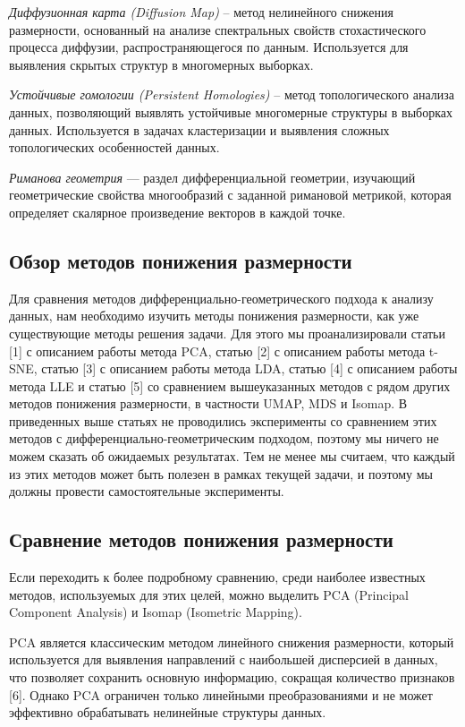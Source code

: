 \documentclass[a4paper,12pt]{extarticle}
\begin{document}
\textit{Диффузионная карта (Diffusion Map)} – метод нелинейного снижения размерности, основанный на анализе спектральных свойств стохастического процесса диффузии, распространяющегося по данным. Используется для выявления скрытых структур в многомерных выборках.

\textit{Устойчивые гомологии (Persistent Homologies)} – метод топологического анализа данных, позволяющий выявлять устойчивые многомерные структуры в выборках данных. Используется в задачах кластеризации и выявления сложных топологических особенностей данных.

\textit{Риманова геометрия} — раздел дифференциальной геометрии, изучающий геометрические свойства многообразий с заданной римановой метрикой, которая определяет скалярное произведение векторов в каждой точке.

\subsection{Обзор методов понижения размерности}

Для сравнения методов дифференциально-геометрического подхода к анализу
данных, нам необходимо изучить методы понижения размерности, как уже существующие методы решения задачи. Для этого мы проанализировали статьи [1] с описанием работы метода PCA, статью [2] с описанием работы метода t-SNE, статью [3] с описанием работы метода LDA, статью [4] с описанием работы метода LLE и статью [5] со сравнением вышеуказанных методов с рядом других методов понижения размерности, в частности UMAP, MDS и Isomap. В приведенных выше статьях не проводились эксперименты со сравнением этих методов с  дифференциально-геометрическим подходом, поэтому мы ничего не можем сказать об ожидаемых результатах. Тем не менее мы считаем, что каждый из этих методов может быть полезен в рамках текущей задачи, и поэтому мы должны провести самостоятельные эксперименты. 

\subsection{Сравнение методов понижения размерности}

Если переходить к более подробному сравнению, среди наиболее известных методов, используемых для этих целей, можно выделить PCA (Principal Component Analysis) и Isomap (Isometric Mapping).

PCA является классическим методом линейного снижения размерности, который используется для выявления направлений с наибольшей дисперсией в данных, что позволяет сохранить основную информацию, сокращая количество признаков [6]. Однако PCA ограничен только линейными преобразованиями и не может эффективно обрабатывать нелинейные структуры данных.
\end{document}
